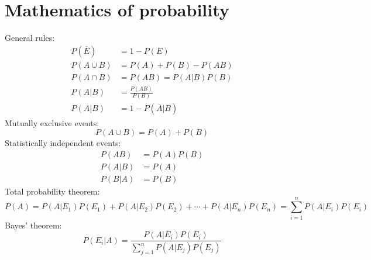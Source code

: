 \documentclass[10pt,twoside]{article}
\newcommand{\?}{\stackrel{?}{=}}
\newcommand{\fr}{\frac}
\newcommand{\ol}{\overline}
\begin{document}
\section{Mathematics of probability}
General rules:
\begin{align}
  P(\ol{E}) &= 1- P(E) \\
  P(A\cup B) &= P(A) + P(B) - P(AB) \\
  P(A\cap B) &= P(AB) = P(A|B)P(B) \\
  P(A|B) &= \fr{P(AB)}{P(B)}\\
  P(A|B) &= 1 - P(\ol{A}|B)
\end{align}
Mutually exclusive events:
\begin{equation}
    P(A\cup B) = P(A) + P(B) 
\end{equation}
Statistically independent events:
\begin{align}
  P(AB) &= P(A)P(B) \\
  P(A|B) &= P(A) \\
  P(B|A) &= P(B)
\end{align}
Total probability theorem:
\begin{equation}
  P(A) = P(A|E_1)P(E_1) + P(A|E_2)P(E_2) + \cdots + P(A|E_n)P(E_n) = \sum_{i=1}^n P(A|E_i)P(E_i)
\end{equation}
Bayes' theorem:
\begin{equation}
  \label{eq:2}
  P(E_i|A) = \fr{P(A|E_i)P(E_i)}{\sum_{j=1}^nP(A|E_j)P(E_j)}
\end{equation}
\end{document}

